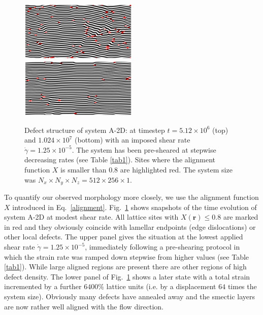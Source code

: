 \documentclass[8.5pt,twoside,twocolumn]{article}
\newcommand{\e}[1]{\times10^{#1}}
\begin{document}
\begin{figure}[htp]
\centering
\includegraphics[angle=0,width=0.5\textwidth]{phi_defects_run774_5120.jpg}
\includegraphics[angle=0,width=0.5\textwidth]{phi_defects_run774_10240.jpg}
\caption{Defect structure of system A-2D: at timestep $t=5.12\e{6}$ (top) and $1.024\e{7}$ (bottom) with an imposed shear rate $\dot{\gamma}=1.25\times10^{-5}$. The system has been pre-sheared at stepwise decreasing rates (see Table \ref{tab1}). Sites where the alignment function $X$ is smaller than $0.8$ are highlighted red. The system size was $N_x\times N_y \times N_z=512\times 256 \times 1$.}
\label{fig3}
\end{figure}

To quantify our observed morphology more closely, we use the alignment function $X$ introduced in Eq.~\ref{alignment}.
Fig.~\ref{fig3} shows snapshots of the time evolution of system A-2D at modest shear rate.
All lattice sites with $X({\mathbf r})\le0.8$ are marked in red and they obviously coincide with lamellar endpoints (edge dislocations) or other local defects.
The upper panel gives the situation at the lowest applied shear rate $\dot{\gamma}=1.25\e{-5}$, immediately following a pre-shearing protocol in which the strain rate was ramped down stepwise from higher values (see Table \ref{tab1}). While large aligned regions are present there are other regions of high defect density.
The lower panel of Fig.~\ref{fig3} shows a later state with a total strain incremented by a further $6400\%$ lattice units (i.e. by a displacement $64$ times the system size). 
Obviously many defects have annealed away and the smectic layers are now rather well aligned with the flow direction.
\end{document}
